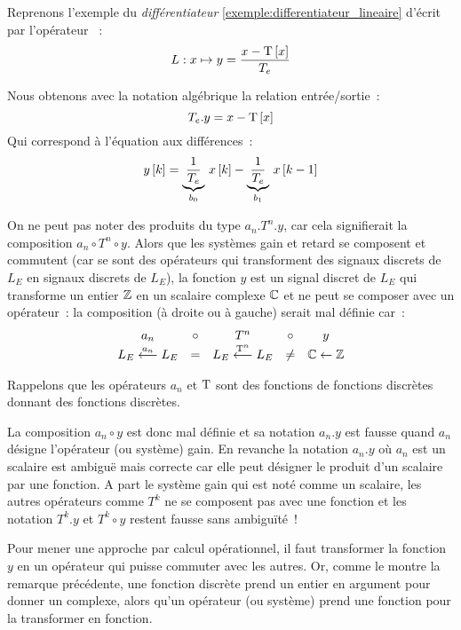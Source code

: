 \begin{exemple}
  Reprenons l'exemple du \emph{différentiateur} \ref{exemple:differentiateur_lineaire} d'écrit par l'opérateur ~: $$L : x \mapsto y=\frac{x-\mathrm{T}\left[x\right]}{T_e}$$
  
  Nous obtenons avec la notation algébrique la relation entrée/sortie~:
  $$
  T_e.y = x - \mathrm{T}\left[x\right]
  $$
  Qui correspond à l'équation aux différences~:
  $$
  y\left[k\right] = \underbrace{\frac{1}{T_e}}_{b_0}\,x\left[k\right]-\underbrace{\frac{1}{T_e}}_{b_1}\,x\left[k-1\right]
  $$
  
\end{exemple}

\begin{remarque}
  On ne peut pas noter des produits du type $a_n.T^n.y$, car cela
  signifierait la composition $a_n\circ T^n\circ y$. Alors que les
  systèmes gain et retard se composent et commutent (car se sont des
  opérateurs qui transforment des signaux discrets de $L_E$ en signaux
  discrets de $L_E$), la fonction $y$ est un signal discret de $L_E$
  qui transforme un entier $\mathbb{Z}$ en un scalaire complexe $\mathbb{C}$ et ne
  peut se composer avec un opérateur~: la composition (à droite ou à
  gauche) serait mal définie car~:
  \begin{equation*}
    \begin{array}{ccccc}
      a_n   & \circ &   T^n  & \circ &  y \\
      L_E \overset{a_n}{\longleftarrow} L_E & =  & L_E \overset{\mathrm{T}^n}{\longleftarrow} L_E & \neq  & \mathbb{C} \leftarrow \mathbb{Z} 
    \end{array}
  \end{equation*}

  Rappelons que les opérateurs $a_n$ et $\mathrm{T}$ sont des
  \og{}fonctions de fonctions discrètes donnant des fonctions
  discrètes\fg{}.

  La composition $a_n\circ y$ est donc mal définie et sa notation
  $a_n.y$ est fausse quand $a_n$ désigne l'opérateur (ou système)
  gain. En revanche la notation $a_n.y$ où $a_n$ est un scalaire est
  ambiguë mais correcte car elle peut désigner le produit d'un
  scalaire par une fonction. A part le système gain qui est noté comme
  un scalaire, les autres opérateurs comme $T^k$ ne se composent pas
  avec une fonction et les notation $T^k.y$ et $T^k\circ y$ restent
  fausse sans ambiguïté~!
\end{remarque}



Pour mener une approche par calcul opérationnel, il faut transformer
la fonction $y$ en un opérateur qui puisse commuter avec les autres.
Or, comme le montre la remarque précédente, une fonction discrète prend
un entier en argument pour donner un complexe, alors qu'un opérateur
(ou système) prend une fonction pour la transformer en fonction.

